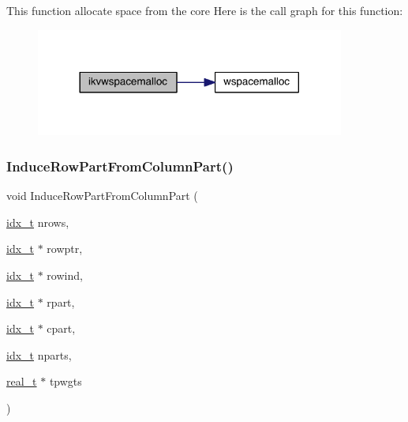 This function allocate space from the core Here is the call graph for this function\+:\nopagebreak
\begin{figure}[H]
\begin{center}
\leavevmode
\includegraphics[width=288pt]{a00945_aebd176cd270536b20fce61e9057461fb_cgraph}
\end{center}
\end{figure}
\mbox{\label{a00945_ae1253bac89c47d556436695e62bcfacd}} 
\subsubsection{\texorpdfstring{Induce\+Row\+Part\+From\+Column\+Part()}{InduceRowPartFromColumnPart()}}
{\footnotesize\ttfamily void Induce\+Row\+Part\+From\+Column\+Part (\begin{DoxyParamCaption}\item[{\hyperlink{a00876_aaa5262be3e700770163401acb0150f52}{idx\+\_\+t}}]{nrows,  }\item[{\hyperlink{a00876_aaa5262be3e700770163401acb0150f52}{idx\+\_\+t} $\ast$}]{rowptr,  }\item[{\hyperlink{a00876_aaa5262be3e700770163401acb0150f52}{idx\+\_\+t} $\ast$}]{rowind,  }\item[{\hyperlink{a00876_aaa5262be3e700770163401acb0150f52}{idx\+\_\+t} $\ast$}]{rpart,  }\item[{\hyperlink{a00876_aaa5262be3e700770163401acb0150f52}{idx\+\_\+t} $\ast$}]{cpart,  }\item[{\hyperlink{a00876_aaa5262be3e700770163401acb0150f52}{idx\+\_\+t}}]{nparts,  }\item[{\hyperlink{a00876_a1924a4f6907cc3833213aba1f07fcbe9}{real\+\_\+t} $\ast$}]{tpwgts }\end{DoxyParamCaption})}

